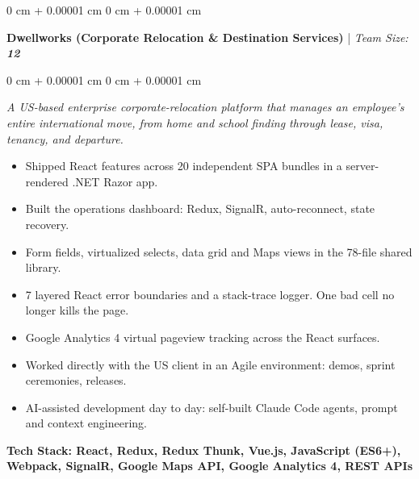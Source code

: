 \documentclass[10pt, letterpaper]{article}
\newenvironment{highlights}{
    \begin{itemize}[
        topsep=0.12 cm,
        leftsep=0.20cm,
        parsep=0.12 cm,
        partopsep=0pt,
        parindent=4pt,
        itemsep=4pt,
        leftmargin=0 cm + 20pt
    ]
}{
    \end{itemize}
}
\newenvironment{onecolentry}{
    \begin{adjustwidth}{
        0 cm + 0.00001 cm
    }{
        0 cm + 0.00001 cm
    }
}{
    \end{adjustwidth}
}
\begin{document}
    \begin{onecolentry}
        \textbf{Dwellworks (Corporate Relocation \& Destination Services)} | \textit{Team Size:} \textbf{\textit{12}}
    \end{onecolentry}
    \vspace{0.10 cm}
    \begin{onecolentry}
        \textit{A US-based enterprise corporate-relocation platform that manages an employee's entire international move, from home and school finding through lease, visa, tenancy, and departure.}
        \begin{highlights}
            \item Shipped React features across 20 independent SPA bundles in a server-rendered .NET Razor app.
            \item Built the operations dashboard: Redux, SignalR, auto-reconnect, state recovery.
            \item Form fields, virtualized selects, data grid and Maps views in the 78-file shared library.
            \item 7 layered React error boundaries and a stack-trace logger. One bad cell no longer kills the page.
            \item Google Analytics 4 virtual pageview tracking across the React surfaces.
            \item Worked directly with the US client in an Agile environment: demos, sprint ceremonies, releases.
            \item AI-assisted development day to day: self-built Claude Code agents, prompt and context engineering.
        \end{highlights}
        \vspace{0.10 cm}
        \textbf{Tech Stack: React, Redux, Redux Thunk, Vue.js, JavaScript (ES6+), Webpack, SignalR, Google Maps API, Google Analytics 4, REST APIs}
    \end{onecolentry}

    \vspace{0.34 cm}
\end{document}
